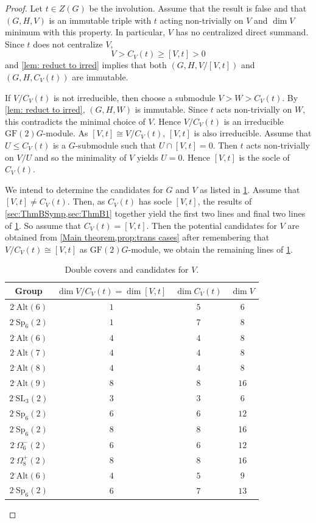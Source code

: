 \documentclass[12pt]{amsart}
\theoremstyle{remark}
\theoremstyle{notation}
\theoremstyle{definition}
\newcommand{\GF}{\mathrm{GF}}
\newcommand{\Sp}{\mathrm{Sp}}
\newcommand{\SL}{\mathrm{SL}}
\newcommand{\0}{\emptyset}
\newcommand{\Alt}{\mathrm{Alt}}
\begin{document}
\begin{proof}  Let $t\in Z(G)$ be the involution. Assume that the result is false and that $(G,H,V)$ is an immutable triple with $t$ acting non-trivially on $V$ and $\dim V$  minimum with this property. In particular,  $V$ has no centralized direct summand. Since $t$ does not centralize $V$, $$V>C_V(t)\ge [V,t]>0$$ and \cref{lem: reduct to irred} implies that both $(G,H,V/[V,t])$ and $(G, H,C_V(t))$ are immutable.

If  $  V/C_V(t)$ is not irreducible, then choose a submodule $V>W>C_V(t)$. By \cref{lem: reduct to irred}, $(G, H,W)$ is immutable. Since $t$ acts non-trivially on $W$, this contradicts the minimal choice of $V$. Hence $V/C_V(t)$ is an irreducible $\GF(2)G$-module. As     $[V,t]\cong V/C_V(t)$, $[V,t]$ is also irreducible.  Assume that $U \le C_V(t)$ is a $G$-submodule such that $U \cap [V,t]=0$. Then $t$ acts non-trivially on $V/U$ and so the minimality of $V$ yields $U=0$. Hence $[V,t]$ is the socle of $C_V(t)$.

We intend to determine the candidates for $G$ and $V$ as listed in \cref{tab:double covers}.
  Assume that $[V,t] \ne C_V(t)$. Then, as $C_V(t)$ has socle $[V,t]$, the results of \cref{sec:ThmBSymp,sec:ThmB1} together yield the first two lines and final two lines of \cref{tab:double covers}. So assume that $C_V(t)=[V,t]$. Then the  potential candidates for $V$ are obtained from \cref{Main theorem,prop:trans cases} after remembering that $V/C_V(t)\cong [V,t]$ as $\GF(2)G$-module, we obtain the remaining lines of \cref{tab:double covers}.


\begin{table}[h]
\begin{tabular}{cccc}\hline
Group&$\dim V/C_V(t)=\dim [V,t]$&$\dim C_V(t)$&$\dim V$\\\hline
$2^.\Alt(6)$&$1$&$5$&$6$\\
$2^.\Sp_6(2)$&$1$&$7$&$8$\\
$2^.\Alt(6)$&$4$&$4$&$8$\\
$2^.\Alt(7)$&$4 $&$4$&$8$\\
$2^.\Alt(8)$&$4 $&$4$&$8$\\
$2^.\Alt(9)$&$8 $&$8$&$16$\\
$2^.\SL_3(2)$&$3$&$3$&$6$\\
$2^.\Sp_6(2)$&$6$&$6$&$12$\\
$2^.\Sp_6(2)$&8&8&16\\
 $2^.\Omega_6^-(2)$&$6$&$6$&$12$\\
$2^.\Omega_8^+ (2)$&$8$&$8$&$16$\\
$2^.\Alt(6)$&$4$&$5$&$9$\\
$2^.\Sp_6(2)$&$6$&$7$&$13$\\
\hline
\end{tabular}\vspace{3mm}\caption{Double covers and candidates for $V$.}\label{tab:double covers}
\end{table}


\end{proof}
\end{document}
